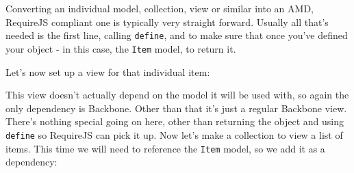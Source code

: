 \documentclass[9pt]{book}
\newenvironment{Shaded}{}{}
\newcommand{\KeywordTok}[1]{\textcolor[rgb]{0.00,0.44,0.13}{\textbf{{#1}}}}
\newcommand{\DataTypeTok}[1]{\textcolor[rgb]{0.56,0.13,0.00}{{#1}}}
\newcommand{\StringTok}[1]{\textcolor[rgb]{0.25,0.44,0.63}{{#1}}}
\newcommand{\OtherTok}[1]{\textcolor[rgb]{0.00,0.44,0.13}{{#1}}}
\newcommand{\FunctionTok}[1]{\textcolor[rgb]{0.02,0.16,0.49}{{#1}}}
\newcommand{\NormalTok}[1]{{#1}}
\begin{document}
Converting an individual model, collection, view or similar into an AMD,
RequireJS compliant one is typically very straight forward. Usually all
that's needed is the first line, calling \texttt{define}, and to make
sure that once you've defined your object - in this case, the
\texttt{Item} model, to return it.

Let's now set up a view for that individual item:

\begin{Shaded}
\end{Shaded}

This view doesn't actually depend on the model it will be used with, so
again the only dependency is Backbone. Other than that it's just a
regular Backbone view. There's nothing special going on here, other than
returning the object and using \texttt{define} so RequireJS can pick it
up. Now let's make a collection to view a list of items. This time we
will need to reference the \texttt{Item} model, so we add it as a
dependency:
\end{document}
